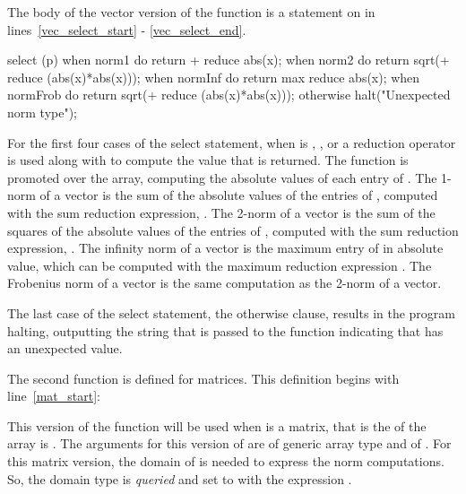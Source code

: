 The body of the vector version of the  function is a  
statement  on
 in lines~\ref{vec_select_start} - \ref{vec_select_end}.  
\begin{chapel}
select (p) {                                   
      when norm1 do return + reduce abs(x);   
      when norm2 do return sqrt(+ reduce (abs(x)*abs(x)));  
      when normInf do return max reduce abs(x);  
      when normFrob do return sqrt(+ reduce (abs(x)*abs(x)));
      otherwise halt("Unexpected norm type"); 
    } 
\end{chapel}
For the first four cases of the select statement,
when  is , ,  or 
a reduction operator is used along with  to compute the value 
that is returned.  The  function is promoted over the  array, 
computing the absolute values of each entry of .  
The 1-norm of a vector is the sum of the absolute values of the entries of ,
computed with the sum reduction expression, .  
The 2-norm of a vector is the sum of the squares of the absolute values of
the entries of , computed with the sum reduction expression,
.
The infinity norm of a vector is the maximum entry of  in absolute value,
which can be computed with the maximum reduction expression .
The Frobenius norm of a vector is the same computation as the 2-norm of a vector.

The last case of the select statement, the otherwise clause, results
in the program halting, outputting the string that is passed to the 
function indicating that  has an unexpected value.   

The second  function is defined for matrices.  This definition begins
with line~\ref{mat_start}:
\begin{chapel}
  def norm(x: [?D], p: normType) where x.rank == 2 {
\end{chapel}
This version of the function will be used when  is a matrix,
that is the  of the array  is .  The arguments
for this version of  are  of generic array type and 
of .  For this matrix version, the domain of  is
needed to express the  norm computations.  So, the domain type is {\em queried} 
and set to  with the expression \chpl{[?D]}.  

